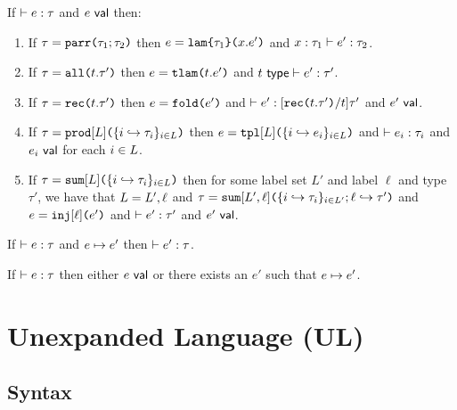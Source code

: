 \begin{condition}\label{condition:canonical-forms-UP} If $\vdash e : \tau$ and $e~\mathsf{val}$ then:
\begin{enumerate}
\item If $\tau=\texttt{parr}\texttt{(}\tau_1; \tau_2\texttt{)}$ then $e=\texttt{lam}\texttt{\{}\tau_1\texttt{\}(}x.e'\texttt{)}$ and $x : \tau_1 \vdash e' : \tau_2$.
\item If $\tau=\texttt{all}\texttt{(}t.\tau'\texttt{)}$ then $e=\texttt{tlam}\texttt{(}t.e'\texttt{)}$ and $t~\mathsf{type} \vdash e' : \tau'$.
\item If $\tau=\texttt{rec}\texttt{(}t.\tau'\texttt{)}$ then $e=\texttt{fold}\texttt{(}e'\texttt{)}$ and $\vdash e' : [\texttt{rec}\texttt{(}t.\tau'\texttt{)}/t]\tau'$ and $e'~\mathsf{val}$. 
\item If $\tau=\texttt{prod}[L]\texttt{(}\{i \hookrightarrow \tau_{i}\}_{i \in L}\texttt{)}$ then $e=\texttt{tpl}[L]\texttt{(}\{i \hookrightarrow e_{i}\}_{i \in L}\texttt{)}$ and $\vdash e_i : \tau_i$ and $e_i~\mathsf{val}$ for each $i \in L$.
\item If $\tau=\texttt{sum}[L]\texttt{(}\{i \hookrightarrow \tau_{i}\}_{i \in L}\texttt{)}$ then for some label set $L'$ and label $\ell$ and type $\tau'$, we have that $L=L', \ell$ and $\tau=\texttt{sum}[L', \ell]\texttt{(}\{i \hookrightarrow \tau_{i}\}_{i \in L'}; \ell \hookrightarrow \tau'\texttt{)}$ and $e=\texttt{inj}[\ell]\texttt{(}e'\texttt{)}$ and $\vdash e' : \tau'$ and $e'~\mathsf{val}$.
\end{enumerate}\end{condition}


\begin{condition}[Preservation]\label{condition:preservation-UP} If $\vdash e : \tau$ and $e \mapsto e'$ then $\vdash e' : \tau$. \end{condition}

\begin{condition}[Progress]\label{condition:progress-UP} If $\vdash e : \tau$ then either $e~\mathsf{val}$  or there exists an $e'$ such that $e \mapsto e'$. \end{condition}

\section{Unexpanded Language (UL)}\label{appendix:SES-uexps}
\subsection{Syntax}\label{appendix:SES-syntax}\label{appendix:SES-shared-forms}
